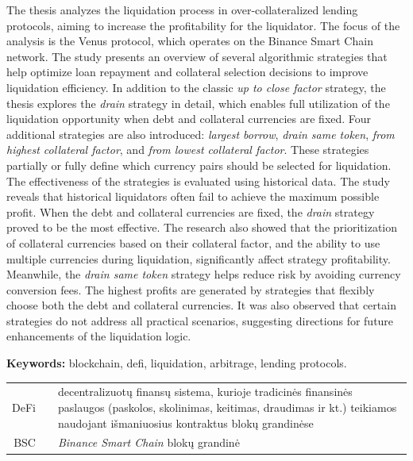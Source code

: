 \documentclass[]{VUMIFTemplateClass}
\begin{document}
The thesis analyzes the liquidation process in over-collateralized lending protocols, aiming to increase the profitability for the liquidator. The focus of the analysis is the Venus protocol, which operates on the Binance Smart Chain network. The study presents an overview of several algorithmic strategies that help optimize loan repayment and collateral selection decisions to improve liquidation efficiency. In addition to the classic \textit{up to close factor} strategy, the thesis explores the \textit{drain} strategy in detail, which enables full utilization of the liquidation opportunity when debt and collateral currencies are fixed. Four additional strategies are also introduced: \textit{largest borrow}, \textit{drain same token}, \textit{from highest collateral factor}, and \textit{from lowest collateral factor}. These strategies partially or fully define which currency pairs should be selected for liquidation. The effectiveness of the strategies is evaluated using historical data.
The study reveals that historical liquidators often fail to achieve the maximum possible profit. When the debt and collateral currencies are fixed, the \textit{drain} strategy proved to be the most effective. The research also showed that the prioritization of collateral currencies based on their collateral factor, and the ability to use multiple currencies during liquidation, significantly affect strategy profitability. Meanwhile, the \textit{drain same token} strategy helps reduce risk by avoiding currency conversion fees. The highest profits are generated by strategies that flexibly choose both the debt and collateral currencies. It was also observed that certain strategies do not address all practical scenarios, suggesting directions for future enhancements of the liquidation logic.

\noindent\textbf{Keywords:} blockchain, defi, liquidation, arbitrage, lending protocols.


\begin{tabular}{rcp{}}
    {DeFi} & {} & {decentralizuotų finansų sistema, kurioje tradicinės finansinės paslaugos (paskolos, skolinimas, keitimas, draudimas ir kt.) teikiamos naudojant išmaniuosius kontraktus blokų grandinėse} \\ 
    {BSC} & {} & {\textit{Binance Smart Chain} blokų grandinė}
\end{tabular}
\end{document}
